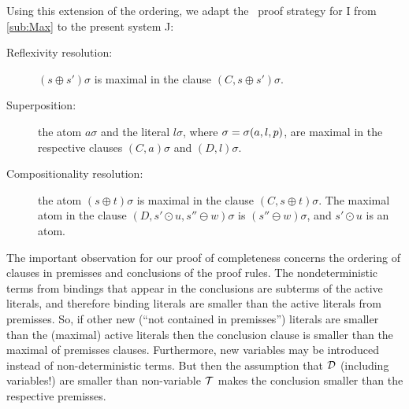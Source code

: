 Using this extension of the ordering, we adapt the \strategy\ proof strategy
for \C I from \ref{sub:Max} to the present system \C J:
\begin{description}%
\item[Reflexivity resolution:] \((s\oplus s')\sigma\) is maximal
in the clause \((C,s\oplus s')\sigma\).
\item [Superposition:] the atom \(a\sigma\) and the literal \(l\sigma\),
where \(\sigma=\sigma(a,l,p)\), are maximal in the respective clauses
\((C,a)\sigma\) and \((D,l)\sigma\).
\item [Compositionality resolution:] the atom \((s\oplus t)\sigma\) is maximal
in the clause \((C,s\oplus t )\sigma\). The maximal atom in the clause
\((D, s'\odot u, s''\ominus w)\sigma\) is \((s''\ominus w)\sigma\), and
\(s'\odot u\) is an atom.
\end{description}
%
The important observation for our proof of completeness concerns the ordering of
clauses in premisses and conclusions of the proof rules.  The
nondeterministic terms from bindings that appear in the conclusions are subterms
of the active literals, and therefore binding literals are smaller than
the active literals from premisses.  So, if other new (``not contained
in premisses'') literals are smaller than the (maximal) active literals
then the conclusion clause is smaller than the maximal of premisses clauses.
Furthermore, new variables may be introduced instead of non-deterministic terms.
But then the assumption that ${\cal D}$ (including variables!) 
are smaller than non-variable ${\cal T}$ makes the conclusion smaller than the 
respective premisses.
%
%
